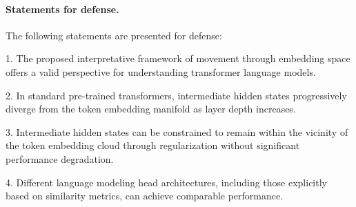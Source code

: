 \paragraph{Statements for defense.}
The following statements are presented for defense:

1. The proposed interpretative framework of movement through embedding space offers a valid perspective for understanding transformer language models.

2. In standard pre-trained transformers, intermediate hidden states progressively diverge from the token embedding manifold as layer depth increases.

3. Intermediate hidden states can be constrained to remain within the vicinity of the token embedding cloud through regularization without significant performance degradation.

4. Different language modeling head architectures, including those explicitly based on similarity metrics, can achieve comparable performance.
